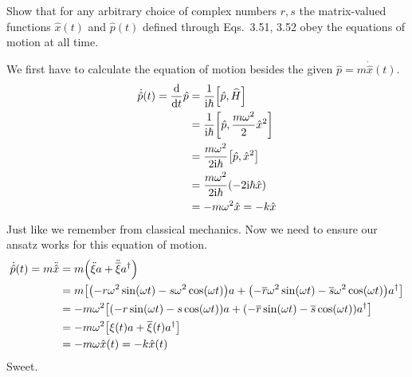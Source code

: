 \documentclass[boxes,pages]{homework}
\makeatletter
\newcommand{\iu}{\mathrm{i}}
\newcommand{\conj}[1]{\overline{#1}}
\numberwithin{@problem}{section}
\makeatother
\begin{document}
\setcounter{section}{3}

\begin{problem}
Show that for any arbitrary choice of complex numbers $r, s$ the matrix-valued functions $\hat{x}(t)$ and $\hat{p}(t)$ defined through Eqs.\ 3.51, 3.52 obey the equations of motion at all time.
\end{problem}

\begin{solution}
	We first have to calculate the equation of motion besides the given $\hat{p} = m\dot{\hat{x}}(t)$.
	\begin{align*}
		\dot{\hat{p}}(t) = \dv{t}\hat{p} & = \frac{1}{\iu\hbar}\comm{\hat{p}}{\widehat{H}}                  \\
		                                 & = \frac{1}{\iu\hbar}\comm{\hat{p}}{\frac{m\omega^2}{2}\hat{x}^2} \\
		                                 & = \frac{m\omega^2}{2\iu\hbar}\comm{\hat{p}}{\hat{x}^2}           \\
		                                 & = \frac{m\omega^2}{2\iu\hbar}\qty(-2\iu\hbar\hat{x})             \\
		                                 & = -m\omega^2\hat{x} = -k\hat{x}
	\end{align*}
	Just like we remember from classical mechanics. Now we need to ensure our ansatz works for this equation of motion.
	\begin{align*}
		\dot{\hat{p}}(t) = m\ddot{\hat{x}} & = m\qty(\ddot{\xi}a + \ddot{\conj{\xi}}a^\dagger)                                                                                                    \\
		                                   & = m\qty[\qty(-r\omega^2\sin(\omega t) - s\omega^2\cos(\omega t))a + \qty(-\conj{r}\omega^2\sin(\omega t) - \conj{s}\omega^2\cos(\omega t))a^\dagger] \\
		                                   & = -m\omega^2\qty[\qty(-r\sin(\omega t) - s\cos(\omega t))a + \qty(-\conj{r}\sin(\omega t) - \conj{s}\cos(\omega t))a^\dagger]                        \\
		                                   & = -m\omega^2\qty[\xi(t)a + \conj{\xi}(t)a^\dagger]                                                                                                   \\
		                                   & = -m\omega\hat{x}(t) = -k\hat{x}(t)
	\end{align*}
	Sweet.
\end{solution}
\end{document}
